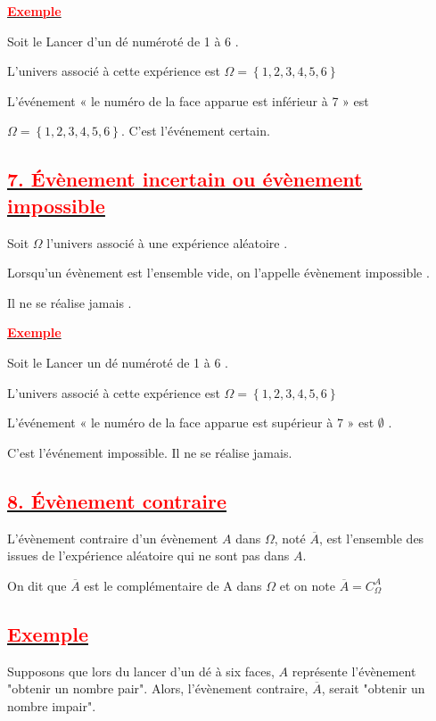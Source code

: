 \documentclass[12pt]{article}
\begin{document}
\underline{\textbf{\textcolor{red}{Exemple}}}

Soit le Lancer d’un dé numéroté de 1 à 6 .

L’univers associé à cette expérience est $\Omega = \left\lbrace 1, 2, 3, 4, 5, 6\right\rbrace $

L’événement « le numéro de la face apparue est inférieur à 7 » est 

$\Omega = \left\lbrace 1, 2, 3, 4, 5, 6\right\rbrace $. C’est l’événement certain.

\subsection*{\underline{\textbf{\textcolor{red}{7. Évènement incertain ou évènement impossible}}}}
Soit $\Omega$ l’univers associé à une expérience aléatoire .

Lorsqu’un évènement est l’ensemble vide, on l’appelle évènement impossible .

Il ne se réalise jamais .

\underline{\textbf{\textcolor{red}{Exemple}}}

Soit le Lancer un dé numéroté de 1 à 6 .

L’univers associé à cette expérience est $\Omega = \left\lbrace 1, 2, 3, 4, 5, 6 \right\rbrace $

L’événement « le numéro de la face apparue est supérieur à 7 » est $\emptyset$ .

C’est l’événement impossible. Il ne se réalise jamais.
\subsection*{\underline{\textbf{\textcolor{red}{8. Évènement contraire}}}}

L'évènement contraire d'un évènement $A$ dans $\Omega$, noté $\overline{A}$, est l'ensemble des issues de l'expérience aléatoire qui ne sont pas dans $A$.

On dit que $\overline{A}$ est le complémentaire de A dans $\Omega$ et on note 
$\overline{A}=C^{A}_{\Omega}$
\subsection*{\underline{\textbf{\textcolor{red}{Exemple}}}}

Supposons que lors du lancer d'un dé à six faces, $A$ représente l'évènement "obtenir un nombre pair". Alors, l'évènement contraire, $\overline{A}$, serait "obtenir un nombre impair".
\end{document}
